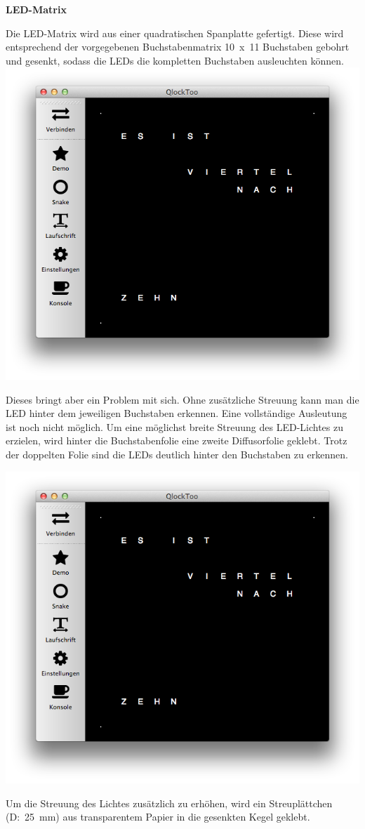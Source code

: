 \begin{multicols}{2}
\textbf{LED-Matrix}

Die LED-Matrix wird aus einer quadratischen Spanplatte gefertigt. Diese wird entsprechend der vorgegebenen Buchstabenmatrix 10~x~11 Buchstaben gebohrt und gesenkt, sodass die LEDs die kompletten Buchstaben ausleuchten können. 
\includegraphics[width=0.9\columnwidth]{Abbildungen/Software/Manager} %

Dieses bringt aber ein Problem mit sich. Ohne zusätzliche Streuung kann man die LED hinter dem jeweiligen Buchstaben erkennen. Eine vollständige Ausleutung ist noch nicht möglich. Um eine möglichst breite Streuung des LED-Lichtes zu erzielen, wird hinter die Buchstabenfolie eine zweite Diffusorfolie geklebt. Trotz der doppelten Folie sind die LEDs deutlich hinter den Buchstaben zu erkennen.

\includegraphics[width=0.9\columnwidth]{Abbildungen/Software/Manager} %

Um die Streuung des Lichtes zusätzlich zu erhöhen, wird ein Streuplättchen (D:~25~mm) aus transparentem Papier in die gesenkten Kegel geklebt. 


\end{multicols}

